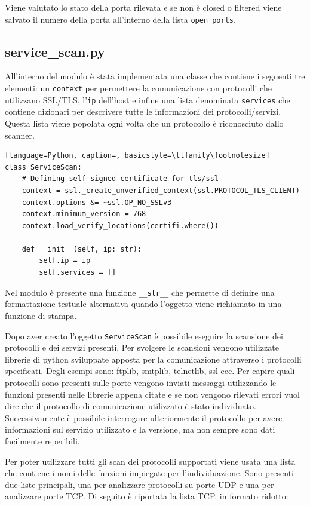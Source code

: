 \documentclass[12pt]{report}
\begin{document}
Viene valutato lo stato della porta rilevata e se non è closed o filtered viene salvato il numero della porta all'interno della lista \lstinline{open_ports}.

\subsection{service\_scan.py}

All'interno del modulo è stata implementata una classe che contiene i seguenti tre elementi: un \lstinline{context} per permettere la comunicazione con protocolli che utilizzano SSL/TLS, l'\lstinline{ip} dell'host e infine una lista denominata \lstinline{services} che contiene dizionari per descrivere tutte le informazioni dei protocolli/servizi. Questa lista viene popolata ogni volta che un protocollo è riconosciuto dallo scanner.

\begin{lstlisting}[language=Python, caption=, basicstyle=\ttfamily\footnotesize]
class ServiceScan:
    # Defining self signed certificate for tls/ssl
    context = ssl._create_unverified_context(ssl.PROTOCOL_TLS_CLIENT)
    context.options &= ~ssl.OP_NO_SSLv3
    context.minimum_version = 768
    context.load_verify_locations(certifi.where())

    def __init__(self, ip: str):
        self.ip = ip
        self.services = []
\end{lstlisting}

Nel modulo è presente una funzione \lstinline{__str__} che permette di definire una formattazione testuale alternativa quando l'oggetto viene richiamato in una funzione di stampa.

Dopo aver creato l'oggetto \lstinline{ServiceScan} è possibile eseguire la scansione dei protocolli e dei servizi presenti. Per svolgere le scansioni vengono utilizzate librerie di python sviluppate apposta per la comunicazione attraverso i protocolli specificati. Degli esempi sono: ftplib, smtplib, telnetlib, ssl ecc. Per capire quali protocolli sono presenti sulle porte vengono inviati messaggi utilizzando le funzioni presenti nelle librerie appena citate e se non vengono rilevati errori vuol dire che il protocollo di comunicazione utilizzato è stato individuato. Successivamente è possibile interrogare ulteriormente il protocollo per avere informazioni sul servizio utilizzato e la versione, ma non sempre sono dati facilmente reperibili.

Per poter utilizzare tutti gli scan dei protocolli supportati viene usata una lista che contiene i nomi delle funzioni impiegate per l'individuazione. Sono presenti due liste principali, una per analizzare protocolli su porte UDP e una per analizzare porte TCP. Di seguito è riportata la lista TCP, in formato ridotto:
\end{document}
